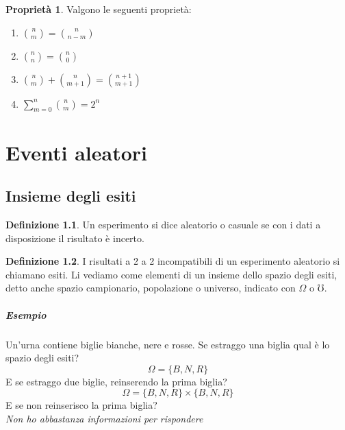 \documentclass[12pt, a4paper]{report}
\theoremstyle{definition}
\newtheorem{definition}{Definizione}[section]
\newtheorem*{property}{Proprietà}
\begin{document}
\begin{property}
	Valgono le seguenti proprietà:
	\begin{enumerate}
		\item \(\binom{n}{m} = \binom{n}{n-m}\)
		\item \(\binom{n}{n} = \binom{n}{0}\)
		\item \(\binom{n}{m} + \binom{n}{m+1} = \binom{n+1}{m+1}\)
		\item \(\sum_{m = 0}^{n}\binom{n}{m} = 2^n\)
	\end{enumerate}	
\end{property}

\chapter{Eventi aleatori}

\section{Insieme degli esiti}
\begin{definition}
	Un esperimento si dice aleatorio o casuale se con i dati a disposizione il
	risultato è incerto.
\end{definition}
\begin{definition}
	I risultati a 2 a 2 incompatibili di un esperimento aleatorio si chiamano
	esiti. Li vediamo come elementi di un insieme dello spazio degli esiti,
	detto anche spazio campionario, popolazione o universo, indicato con $\Omega$
	o $\mho$.
\end{definition}

\paragraph*{Esempio}
Un'urna contiene biglie bianche, nere e rosse.
Se estraggo una biglia qual è lo spazio degli esiti?
\[\Omega=\{B, N, R\}\]
\noindent
E se estraggo due biglie, reinserendo la prima biglia?
\[\Omega=\{B, N, R\}\times \{B, N, R\}\]
\noindent
E se non reinserisco la prima biglia?
\\\textit{Non ho abbastanza informazioni per rispondere}
\end{document}
